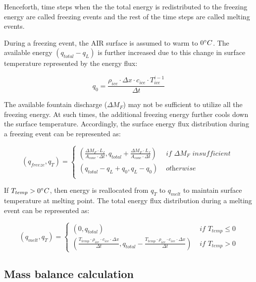 Henceforth, time steps when the the total energy is redistributed to the freezing energy are called freezing
events and the rest of the time steps are called melting events.


During a freezing event, the AIR surface is assumed to warm to $0 ^{\circ} C$. The available energy
$(q_{total}-q_{L})$ is further increased due to this change in surface temperature represented by the energy
flux:

$$q_{0} = \frac{\rho_{ice} \cdot \Delta x \cdot c_{ice} \cdot T_{ice}^{i-1}}{\Delta t}$$

The available fountain discharge ($\Delta M_{F}$) may not be sufficient to utilize all the freezing energy. At such times, 
the additional freezing energy further cools down the surface temperature. Accordingly, the surface energy flux
distribution during a freezing event can be represented as:

\begin{equation}
	(q_{freeze}, q_{T}) = \left\{ \begin{array}{ll}
		(\frac{\Delta M_{F} \cdot L_f
		}{A_{cone} \cdot \Delta t}
		, q_{total}+\frac{\Delta M_{F} \cdot L_f
		}{A_{cone} \cdot \Delta t})          & \textit{ if  } \Delta M_{F} \textit{ insufficient }\\
		(q_{total}-q_{L}+q_{0}, q_{L}-q_{0}) & \textit{ otherwise }                                                                      \\
	\end{array} \right.
\end{equation}

If $T_{temp} > 0 ^{\circ} C$, then energy is reallocated from $q_{T}$ to $q_{melt}$ to maintain surface
temperature at melting point. The total energy flux distribution during a melting event can be represented as:

\begin{equation}
	(q_{melt}, q_{T}) = \left\{ \begin{array}{ll}
		(0, q_{total})
    & \textit{ if } T_{temp} \leq 0 \\
		(\frac{T_{temp} \cdot \rho_{ice} \cdot c_{ice} \cdot \Delta x}{\Delta t}, q_{total}-\frac{T_{temp} \cdot \rho_{ice} \cdot c_{ice} \cdot \Delta x}{\Delta t}  ) & \textit{ if } T_{temp} > 0
	\end{array} \right.
\end{equation}


\subsection{Mass balance calculation}

